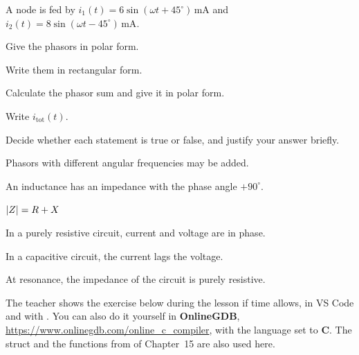 A node is fed by $i_1(t) = 6\sin(\omega t + 45^{\circ})\,\text{mA}$ and
$i_2(t) = 8\sin(\omega t - 45^{\circ})\,\text{mA}$.
\begin{parts}
  \item Give the phasors in polar form.
  \item Write them in rectangular form.
  \item Calculate the phasor sum and give it in polar form.
  \item Write $i_{\text{tot}}(t)$.
\end{parts}

Decide whether each statement is true or false, and justify your answer briefly.
\begin{parts}
  \item Phasors with different angular frequencies may be added.
  \item An inductance has an impedance with the phase angle $+90^{\circ}$.
  \item $\lvert Z\rvert = R + X$
  \item In a purely resistive circuit, current and voltage are in phase.
  \item In a capacitive circuit, the current lags the voltage.
  \item At resonance, the impedance of the circuit is purely resistive.
\end{parts}

The teacher shows the exercise below during the lesson if time allows, in VS Code and with
. You can
also do it yourself in \textbf{OnlineGDB}, \url{https://www.onlinegdb.com/online_c_compiler}, with
the language set to \textbf{C}. The struct  and the functions from 
of Chapter~15 are also used here.

